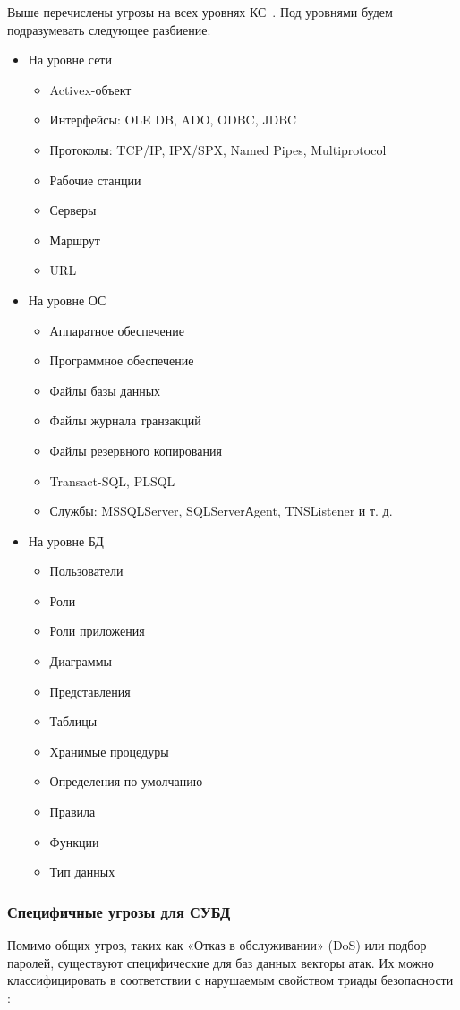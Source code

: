 Выше перечислены угрозы на всех уровнях КС~\label{pon:urovs}. Под уровнями будем подразумевать следующее разбиение:
\begin{itemize}
	\item На уровне сети
	\begin{itemize}
		\item Activex-объект
		\item Интерфейсы: OLE DB, ADO, ODBC, JDBC
		\item Протоколы: TCP/IP, IPX/SPX, Named Pipes, Multiprotocol
		\item Рабочие станции
		\item Серверы
		\item Маршрут
		\item URL
	\end{itemize}
	\item На уровне ОС
	\begin{itemize}
		\item Аппаратное обеспечение
		\item Программное обеспечение
		\item Файлы базы данных
		\item Файлы журнала транзакций
		\item Файлы резервного копирования
		\item Transact-SQL, PLSQL
		\item Службы: MSSQLServer, SQLServerАgent, TNSListener и т. д.
	\end{itemize}
	\item На уровне БД
	\begin{itemize}
		\item Пользователи
		\item Роли
		\item Роли приложения
		\item Диаграммы
		\item Представления
		\item Таблицы
		\item Хранимые процедуры
		\item Определения по умолчанию
		\item Правила
		\item Функции
		\item Тип данных
	\end{itemize}
\end{itemize}

\subsubsection{Специфичные угрозы для СУБД}
Помимо общих угроз, таких как «Отказ в обслуживании» (DoS) или подбор паролей, существуют специфические для баз данных векторы атак. Их можно классифицировать в соответствии с нарушаемым свойством триады безопасности \autocite{Ytebov2008, bdufstec}:


